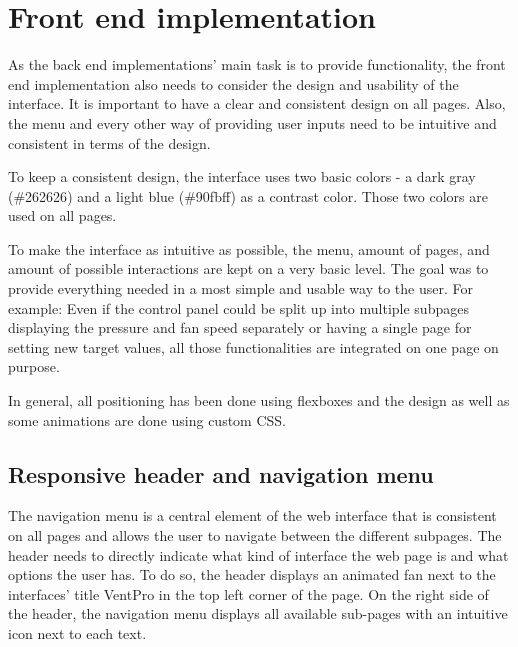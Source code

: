 \chapter{Front end implementation}
\label{ch:front_end_implementation}

As the back end implementations' main task is to provide functionality, the front end implementation also needs to consider the design and usability of the interface. It is important to have a clear and consistent design on all pages. Also, the menu and every other way of providing user inputs need to be intuitive and consistent in terms of the design. 

To keep a consistent design, the interface uses two basic colors - a dark gray (\textcolor{ventpro_gray}{\#262626}) and a light blue (\textcolor{ventpro_blue}{\#90fbff}) as a contrast color. Those two colors are used on all pages.

To make the interface as intuitive as possible, the menu, amount of pages, and amount of possible interactions are kept on a very basic level. The goal was to provide everything needed in a most simple and usable way to the user. For example: Even if the control panel could be split up into multiple subpages displaying the pressure and fan speed separately or having a single page for setting new target values, all those functionalities are integrated on one page on purpose.

In general, all positioning has been done using flexboxes and the design as well as some animations are done using custom CSS.





\section{Responsive header and navigation menu}
\label{sec:responsive_header_and_navigation_menu}

The navigation menu is a central element of the web interface that is consistent on all pages and allows the user to navigate between the different subpages. The header needs to directly indicate what kind of interface the web page is and what options the user has. To do so, the header displays an animated fan next to the interfaces’ title VentPro in the top left corner of the page. On the right side of the header, the navigation menu displays all available sub-pages with an intuitive icon next to each text.

